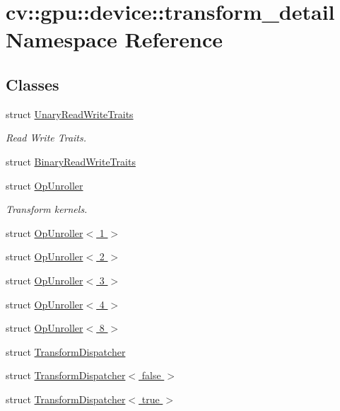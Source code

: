 \hypertarget{namespacecv_1_1gpu_1_1device_1_1transform__detail}{\section{cv\-:\-:gpu\-:\-:device\-:\-:transform\-\_\-detail Namespace Reference}
\label{namespacecv_1_1gpu_1_1device_1_1transform__detail}
}
\subsection*{Classes}
\begin{DoxyCompactItemize}
\item 
struct \hyperlink{structcv_1_1gpu_1_1device_1_1transform__detail_1_1UnaryReadWriteTraits}{Unary\-Read\-Write\-Traits}
\begin{DoxyCompactList}\small\item\em Read Write Traits. \end{DoxyCompactList}\item 
struct \hyperlink{structcv_1_1gpu_1_1device_1_1transform__detail_1_1BinaryReadWriteTraits}{Binary\-Read\-Write\-Traits}
\item 
struct \hyperlink{structcv_1_1gpu_1_1device_1_1transform__detail_1_1OpUnroller}{Op\-Unroller}
\begin{DoxyCompactList}\small\item\em Transform kernels. \end{DoxyCompactList}\item 
struct \hyperlink{structcv_1_1gpu_1_1device_1_1transform__detail_1_1OpUnroller_3_011_01_4}{Op\-Unroller$<$ 1 $>$}
\item 
struct \hyperlink{structcv_1_1gpu_1_1device_1_1transform__detail_1_1OpUnroller_3_012_01_4}{Op\-Unroller$<$ 2 $>$}
\item 
struct \hyperlink{structcv_1_1gpu_1_1device_1_1transform__detail_1_1OpUnroller_3_013_01_4}{Op\-Unroller$<$ 3 $>$}
\item 
struct \hyperlink{structcv_1_1gpu_1_1device_1_1transform__detail_1_1OpUnroller_3_014_01_4}{Op\-Unroller$<$ 4 $>$}
\item 
struct \hyperlink{structcv_1_1gpu_1_1device_1_1transform__detail_1_1OpUnroller_3_018_01_4}{Op\-Unroller$<$ 8 $>$}
\item 
struct \hyperlink{structcv_1_1gpu_1_1device_1_1transform__detail_1_1TransformDispatcher}{Transform\-Dispatcher}
\item 
struct \hyperlink{structcv_1_1gpu_1_1device_1_1transform__detail_1_1TransformDispatcher_3_01false_01_4}{Transform\-Dispatcher$<$ false $>$}
\item 
struct \hyperlink{structcv_1_1gpu_1_1device_1_1transform__detail_1_1TransformDispatcher_3_01true_01_4}{Transform\-Dispatcher$<$ true $>$}
\end{DoxyCompactItemize}
